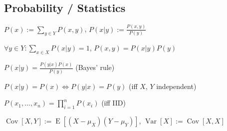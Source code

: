 \documentclass[a4paper, 11pt, landscape]{article}
\begin{document}
\begin{multicols*}{3}
\section{Probability / Statistics}
\begin{compactitem}
	\item $P(x) := \sum_{y \in Y} P(x, y)$, $P(x|y) := \frac{P(x,y)}{P(y)}$
	\item $\forall y \in Y: \sum_{x \in X} P(x|y) = 1$, $P(x, y) = P(x|y) P(y)$
	\item $P(x|y) = \frac{P(y|x)P(x)}{P(y)}$ (Bayes' rule)
	\item $P(x|y) = P(x) \Leftrightarrow P(y|x) = P(y)$ (iff $X$, $Y$ independent)
	\item $P(x_1, \ldots, x_n) = \prod_{i=1}^n P(x_i)$ (iff IID)
	\item $\operatorname{Cov}[X,Y] := \operatorname{E}[(X-\mu_X)(Y-\mu_Y)]$, $\operatorname{Var}[X] := \operatorname{Cov}[X,X]$
\end{compactitem}


\end{multicols*}
\end{document}
